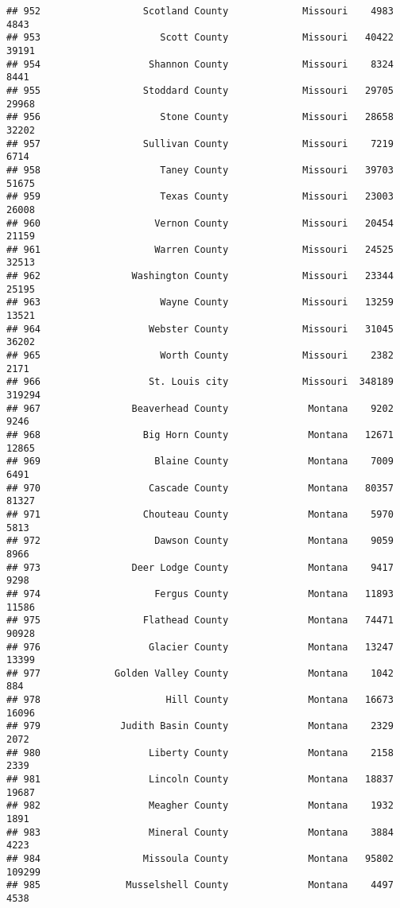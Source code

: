\documentclass[
]{article}
\begin{document}
\begin{verbatim}
## 952                  Scotland County             Missouri    4983    4843
## 953                     Scott County             Missouri   40422   39191
## 954                   Shannon County             Missouri    8324    8441
## 955                  Stoddard County             Missouri   29705   29968
## 956                     Stone County             Missouri   28658   32202
## 957                  Sullivan County             Missouri    7219    6714
## 958                     Taney County             Missouri   39703   51675
## 959                     Texas County             Missouri   23003   26008
## 960                    Vernon County             Missouri   20454   21159
## 961                    Warren County             Missouri   24525   32513
## 962                Washington County             Missouri   23344   25195
## 963                     Wayne County             Missouri   13259   13521
## 964                   Webster County             Missouri   31045   36202
## 965                     Worth County             Missouri    2382    2171
## 966                   St. Louis city             Missouri  348189  319294
## 967                Beaverhead County              Montana    9202    9246
## 968                  Big Horn County              Montana   12671   12865
## 969                    Blaine County              Montana    7009    6491
## 970                   Cascade County              Montana   80357   81327
## 971                  Chouteau County              Montana    5970    5813
## 972                    Dawson County              Montana    9059    8966
## 973                Deer Lodge County              Montana    9417    9298
## 974                    Fergus County              Montana   11893   11586
## 975                  Flathead County              Montana   74471   90928
## 976                   Glacier County              Montana   13247   13399
## 977             Golden Valley County              Montana    1042     884
## 978                      Hill County              Montana   16673   16096
## 979              Judith Basin County              Montana    2329    2072
## 980                   Liberty County              Montana    2158    2339
## 981                   Lincoln County              Montana   18837   19687
## 982                   Meagher County              Montana    1932    1891
## 983                   Mineral County              Montana    3884    4223
## 984                  Missoula County              Montana   95802  109299
## 985               Musselshell County              Montana    4497    4538

\end{verbatim}
\end{document}
